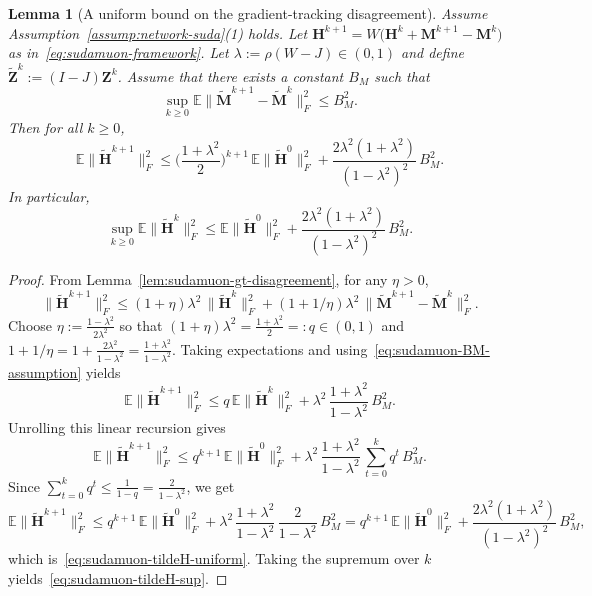 \documentclass{article}
\newtheorem{lemma}{Lemma}
\begin{document}
\begin{lemma}[A uniform bound on the gradient-tracking disagreement]
\label{lem:sudamuon-gt-disagreement-uniform}
Assume Assumption~\ref{assump:network-suda}(1) holds.
Let $\mathbf H^{k+1}=W\bigl(\mathbf H^k+\mathbf M^{k+1}-\mathbf M^k\bigr)$ as in~\eqref{eq:sudamuon-framework}.
Let $\lambda:=\rho(W-J)\in(0,1)$ and define $\tilde{\mathbf Z}^k:=(I-J)\mathbf Z^k$.
Assume that there exists a constant $B_M$ such that
\begin{equation}
\label{eq:sudamuon-BM-assumption}
\sup_{k\ge 0}\mathbb{E}\|\tilde{\mathbf M}^{k+1}-\tilde{\mathbf M}^{k}\|_F^2\le B_M^2.
\end{equation}
Then for all $k\ge 0$,
\begin{equation}
\label{eq:sudamuon-tildeH-uniform}
\mathbb{E}\|\tilde{\mathbf H}^{k+1}\|_F^2
\le \Big(\frac{1+\lambda^2}{2}\Big)^{k+1}\,\mathbb{E}\|\tilde{\mathbf H}^{0}\|_F^2
+ \frac{2\lambda^2(1+\lambda^2)}{(1-\lambda^2)^2}\,B_M^2.
\end{equation}
In particular,
\begin{equation}
\label{eq:sudamuon-tildeH-sup}
\sup_{k\ge 0}\mathbb{E}\|\tilde{\mathbf H}^{k}\|_F^2
\le \mathbb{E}\|\tilde{\mathbf H}^{0}\|_F^2
+ \frac{2\lambda^2(1+\lambda^2)}{(1-\lambda^2)^2}\,B_M^2.
\end{equation}
\end{lemma}
\begin{proof}
From Lemma~\ref{lem:sudamuon-gt-disagreement}, for any $\eta>0$,
\[
\|\tilde{\mathbf H}^{k+1}\|_F^2
\le (1+\eta)\lambda^2\,\|\tilde{\mathbf H}^{k}\|_F^2
+ (1+1/\eta)\lambda^2\,\|\tilde{\mathbf M}^{k+1}-\tilde{\mathbf M}^{k}\|_F^2.
\]
Choose $\eta:=\tfrac{1-\lambda^2}{2\lambda^2}$ so that $(1+\eta)\lambda^2=\tfrac{1+\lambda^2}{2}=:q\in(0,1)$ and
$1+1/\eta = 1 + \tfrac{2\lambda^2}{1-\lambda^2}=\tfrac{1+\lambda^2}{1-\lambda^2}$.
Taking expectations and using~\eqref{eq:sudamuon-BM-assumption} yields
\[
\mathbb{E}\|\tilde{\mathbf H}^{k+1}\|_F^2
\le q\,\mathbb{E}\|\tilde{\mathbf H}^{k}\|_F^2
+ \lambda^2\,\frac{1+\lambda^2}{1-\lambda^2}\,B_M^2.
\]
Unrolling this linear recursion gives
\[
\mathbb{E}\|\tilde{\mathbf H}^{k+1}\|_F^2
\le q^{k+1}\,\mathbb{E}\|\tilde{\mathbf H}^{0}\|_F^2
+ \lambda^2\,\frac{1+\lambda^2}{1-\lambda^2}\,\sum_{t=0}^{k} q^{t}\,B_M^2.
\]
Since $\sum_{t=0}^{k}q^{t}\le \tfrac{1}{1-q}=\tfrac{2}{1-\lambda^2}$, we get
\[
\mathbb{E}\|\tilde{\mathbf H}^{k+1}\|_F^2
\le q^{k+1}\,\mathbb{E}\|\tilde{\mathbf H}^{0}\|_F^2
+ \lambda^2\,\frac{1+\lambda^2}{1-\lambda^2}\,\frac{2}{1-\lambda^2}\,B_M^2
= q^{k+1}\,\mathbb{E}\|\tilde{\mathbf H}^{0}\|_F^2
+ \frac{2\lambda^2(1+\lambda^2)}{(1-\lambda^2)^2}\,B_M^2,
\]
which is~\eqref{eq:sudamuon-tildeH-uniform}.
Taking the supremum over $k$ yields~\eqref{eq:sudamuon-tildeH-sup}.
\end{proof}
\end{document}
